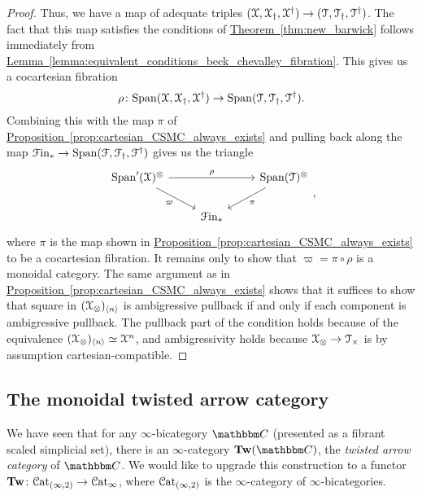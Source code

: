 \documentclass[main.tex]{subfiles}
\begin{document}
\begin{proof}
  Thus, we have a map of adequate triples $(\mathcal{X}, \mathcal{X}_{\dagger}, \mathcal{X}^{\dagger}) \to (\mathcal{T}, \mathcal{T}_{\dagger}, \mathcal{T}^{\dagger})$.
  The fact that this map satisfies the conditions of \hyperref[thm:new_barwick]{Theorem~\ref*{thm:new_barwick}} follows immediately from \hyperref[lemma:equivalent_conditions_beck_chevalley_fibration]{Lemma~\ref*{lemma:equivalent_conditions_beck_chevalley_fibration}}. This gives us a cocartesian fibration
  \begin{equation*}
    \rho\colon \mathrm{Span}(\mathcal{X}, \mathcal{X}_{\dagger}, \mathcal{X}^{\dagger}) \to \mathrm{Span}(\mathcal{T}, \mathcal{T}_{\dagger}, \mathcal{T}^{\dagger}).
  \end{equation*}
  Combining this with the map $\pi$ of \hyperref[prop:cartesian_CSMC_always_exists]{Proposition~\ref*{prop:cartesian_CSMC_always_exists}} and pulling back along the map $\mathcal{F}\mathrm{in}_{*} \to \mathrm{Span}(\mathcal{F}, \mathcal{F}_{\dagger}, \mathcal{F}^{\dagger})$ gives us the triangle
  \begin{equation*}
    \begin{tikzcd}
      \Span'(\category{X})^{\otimes}
      \arrow[rr, "\rho"]
      \arrow[dr, swap, "\varpi"]
      && \Span(\category{T})^{\otimes}
      \arrow[dl, "\pi"]
      \\
      & \Finp
    \end{tikzcd},
  \end{equation*}
  where $\pi$ is the map shown in \hyperref[prop:cartesian_CSMC_always_exists]{Proposition~\ref*{prop:cartesian_CSMC_always_exists}} to be a cocartesian fibration. It remains only to show that $\varpi = \pi \circ \rho$ is a monoidal category. The same argument as in \hyperref[prop:cartesian_CSMC_always_exists]{Proposition~\ref*{prop:cartesian_CSMC_always_exists}} shows that it suffices to show that square in $(\mathcal{X}_{\otimes})_{\langle n \rangle}$ is ambigressive pullback if and only if each component is ambigressive pullback. The pullback part of the condition holds because of the equivalence $(\mathcal{X}_{\otimes})_{\langle n \rangle} \simeq \mathcal{X}^{n}$, and ambigressivity holds because $\mathcal{X}_{\otimes} \to \mathcal{T}_{\times}$ is by assumption cartesian-compatible.
\end{proof}


\subsection{The monoidal twisted arrow category}
\label{ssc:the_monoidal_twisted_arrow_category}

We have seen that for any $\infty$-bicategory $\CC$ (presented as a fibrant scaled simplicial set), there is an $\infty$-category $\Tw(\CC)$, the \emph{twisted arrow category} of $\CC$. We would like to upgrade this construction to a functor $\mathbf{Tw}\colon \mathcal{C}\mathrm{at}_{(\infty,2)} \to \mathcal{C}\mathrm{at}_{\infty}$, where $\mathcal{C}\mathrm{at}_{(\infty,2)}$ is the $\infty$-category of $\infty$-bicategories.
\end{document}
